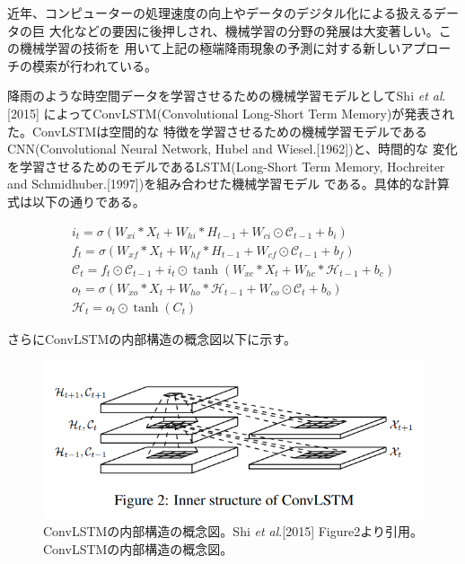 近年、コンピューターの処理速度の向上やデータのデジタル化による扱えるデータの巨
大化などの要因に後押しされ、機械学習の分野の発展は大変著しい。この機械学習の技術を
用いて上記の極端降雨現象の予測に対する新しいアプローチの模索が行われている。

降雨のような時空間データを学習させるための機械学習モデルとしてShi \textit{et al}.[2015]
によってConvLSTM(Convolutional Long-Short Term Memory)が発表された。ConvLSTMは空間的な
特徴を学習させるための機械学習モデルであるCNN(Convolutional Neural Network, Hubel and Wiesel.[1962])と、時間的な
変化を学習させるためのモデルであるLSTM(Long-Short Term Memory, Hochreiter and Schmidhuber.[1997])を組み合わせた機械学習モデル
である。具体的な計算式は以下の通りである。

\begin{gather}
  i_{t} = \sigma\left(W_{xi} * X_{t} + W_{hi} * H_{t−1} + W_{ci} \odot \mathcal{C}_{t−1} + b_{i}\right)\label{eq:convlstm1} \\ 
  f_{t} = \sigma\left(W_{xf} * X_{t} + W_{hf} * H_{t−1} + W_{cf} \odot \mathcal{C}_{t−1} + b_{f}\right)\label{eq:convlstm2} \\
  \mathcal{C}_{t} = f_{t} \odot \mathcal{C}_{t−1} + i_{t} \odot \tanh\left(W_{xc} * X_{t} + W_{hc} * \mathcal{H}_{t−1} + b_{c}\right)\label{eq:convlstm3} \\
  o_{t} = \sigma\left(W_{xo} * X_{t} + W_{ho} * \mathcal{H}_{t−1} + W_{co} \odot \mathcal{C}_{t} + b_{o}\right)\label{eq:convlstm4} \\
  \mathcal{H}_{t} = o_{t} \odot \tanh\left(C_{t}\right)\label{eq:convlstm5} 
\end{gather}

さらにConvLSTMの内部構造の概念図以下に示す。

\begin{figure}[H]
\begin{center}
\includegraphics[width=0.9\linewidth]{fig/intro/inner-structure-of-convlstm.png}
\captionsetup{width=0.9\linewidth}
\caption{ConvLSTMの内部構造の概念図。Shi \textit{et al}.[2015] Figure2より引用。ConvLSTMの内部構造の概念図。}
\label{fig:convlstm-inner-structure}
\end{center}
\end{figure}

